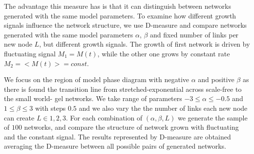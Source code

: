 

The advantage this measure has is that it can distinguish between networks generated with the same model parameters. To examine how different growth signals influence the network structure, we use D-measure and compare networks generated with the same model parameters $\alpha$, $\beta$ and fixed number of links per new node $L$, but different growth signals. The growth of first network is driven by fluctuating signal $M_1 = {M(t)}$, while the other one grows by constant rate $M_2=<M(t)> = const$. 

We focus on the region of model phase diagram with negative $\alpha$ and positive $\beta$ as there is found the transition line from stretched-exponential across scale-free to the small world- gel networks. We take range of parameters  $-3\leq\alpha\leq-0.5$ and $1\leq\beta\leq3$ with steps $0.5$ and we also vary the the number of links each new node can create $L\in{1, 2, 3}$. For each combination of $(\alpha, \beta, L)$ we generate the sample of $100$ networks, and compare the structure of network grown with fluctuating and the constant signal. The results represented by D-measure are obtained averaging the D-measure between all possible pairs of generated networks.     

